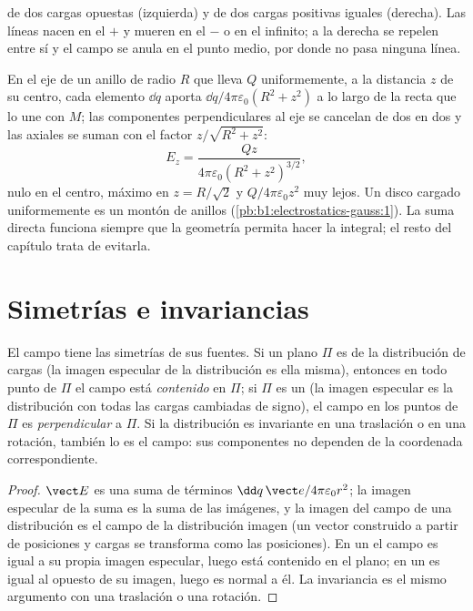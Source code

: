 \begin{omfigure}
{\small {} de dos cargas opuestas (izquierda) y de dos
cargas positivas iguales (derecha). Las líneas nacen en el $+$ y mueren
en el $-$ o en el infinito; a la derecha se repelen entre sí y el campo
se anula en el punto medio, por donde no pasa ninguna línea.}
\end{omfigure}

\begin{example}\label{ex:b1:electrostatics-gauss:ring}
En el eje de un anillo de radio $R$ que lleva $Q$ uniformemente, a la
distancia $z$ de su centro, cada elemento $\dd q$ aporta $\dd q/4\pi\varepsilon_0(R^2 +
z^2)$ a lo largo de la recta que lo une con $M$; las componentes
perpendiculares al eje se cancelan de dos en dos y las axiales se suman
con el factor $z/\sqrt{R^2 + z^2}$:
\[
E_z = \frac{Qz}{4\pi\varepsilon_0(R^2 + z^2)^{3/2}} ,
\]
nulo en el centro, máximo en $z = R/\sqrt2$ y $Q/4\pi\varepsilon_0z^2$ muy lejos.
Un disco cargado uniformemente es un montón de anillos (\cref{pb:b1:electrostatics-gauss:1}).
La suma directa funciona siempre que la geometría permita hacer la
integral; el resto del capítulo trata de evitarla.
\end{example}

\section{Simetrías e invariancias}

\begin{proposition}\label{prop:b1:electrostatics-gauss:symmetry}
El campo tiene las simetrías de sus fuentes. Si un plano $\Pi$ es
\emph{} de la distribución de cargas (la imagen
especular de la distribución es ella misma), entonces en todo punto de
$\Pi$ el campo está \emph{contenido} en $\Pi$; si $\Pi$ es un \emph{} (la imagen especular es la distribución con todas las
cargas cambiadas de signo), el campo en los puntos de $\Pi$ es
\emph{perpendicular} a $\Pi$. Si la distribución es invariante en una
traslación o en una rotación, también lo es el campo: sus componentes no
dependen de la coordenada correspondiente.
\end{proposition}

\begin{proof}
$\vect E$ es una suma de términos $\dd q\,\vect e/4\pi\varepsilon_0r^2$; la imagen
especular de la suma es la suma de las imágenes, y la imagen del campo de
una distribución es el campo de la distribución imagen (un vector
construido a partir de posiciones y cargas se transforma como las
posiciones). En un  el campo es igual a su propia imagen
especular, luego está contenido en el plano; en un 
es igual al opuesto de su imagen, luego es normal a él. La invariancia es
el mismo argumento con una traslación o una rotación.
\end{proof}

